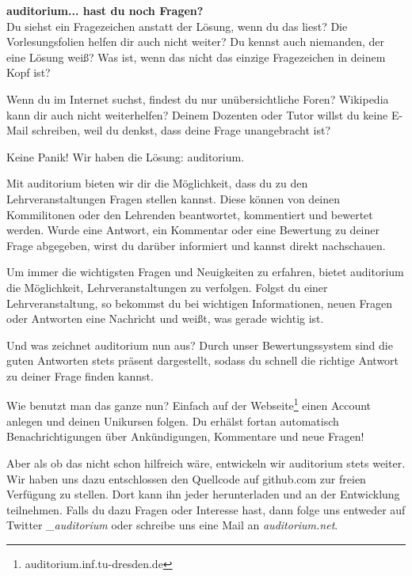 

\textbf{auditorium... hast du noch Fragen?} \\
Du siehst ein Fragezeichen anstatt der Lösung, wenn du das liest?
Die Vorlesungsfolien helfen dir auch nicht weiter? Du kennst auch niemanden, der eine Lösung weiß?
Was ist, wenn das nicht das einzige Fragezeichen in deinem Kopf ist?

Wenn du im Internet suchst, findest du nur unübersichtliche Foren?
Wikipedia kann dir auch nicht weiterhelfen?
Deinem Dozenten oder Tutor willst du keine E-Mail schreiben, weil du denkst, dass deine Frage unangebracht ist?

Keine Panik!
Wir haben die Lösung: auditorium.

Mit auditorium bieten wir dir die Möglichkeit, dass du zu den Lehrveranstaltungen Fragen stellen kannst.
Diese können von deinen Kommilitonen oder den Lehrenden beantwortet, kommentiert und bewertet werden.
Wurde eine Antwort, ein Kommentar oder eine Bewertung zu deiner Frage abgegeben, wirst du darüber informiert und kannst direkt nachschauen.

Um immer die wichtigsten Fragen und Neuigkeiten zu erfahren, bietet auditorium die Möglichkeit, Lehrveranstaltungen zu verfolgen.
Folgst du einer Lehrveranstaltung, so bekommst du bei wichtigen Informationen, neuen Fragen oder Antworten eine Nachricht und weißt, was gerade wichtig ist.

Und was zeichnet auditorium nun aus?
Durch unser Bewertungssystem sind die guten Antworten stets präsent dargestellt, sodass du schnell die richtige Antwort zu deiner Frage finden kannst.

Wie benutzt man das ganze nun?
Einfach auf der Webseite\footnote{auditorium.inf.tu-dresden.de} einen Account anlegen und deinen Unikursen folgen.
Du erhälst fortan automatisch Benachrichtigungen über Ankündigungen, Kommentare und neue Fragen!

Aber als ob das nicht schon hilfreich wäre, entwickeln wir auditorium stets weiter.
Wir haben uns dazu entschlossen den Quellcode auf github.com zur freien Verfügung zu stellen.
Dort kann ihn jeder herunterladen und an der Entwicklung teilnehmen.
Falls du dazu Fragen oder Interesse hast, dann folge uns entweder auf Twitter \textit{\@\_auditorium} oder schreibe uns eine Mail an \textit{auditorium\@inftex.net}.

